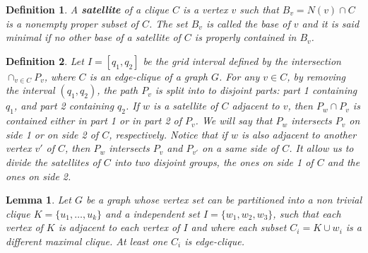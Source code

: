\documentclass[9pt]{entcs}
\newtheorem{lema}{Lemma}[section]
\newtheorem{defi}{Definition}[section]
\begin{document}
\begin{defi}
  A \textbf{satellite} of a clique $C$ is a vertex $v$ such that $B_v=N(v)\cap C$ is a 
nonempty proper subset of $C$. The set $B_v$ is called the base of $v$ and it is said minimal if no other
base of a satellite of $C$ is properly contained in $B_v$.
\end{defi}


\begin{defi}
 Let $I=[q_1,q_2]$ be the grid interval defined by the intersection $\cap_{v\in C}P_v$, where $C$
is an edge-clique of a graph $G$. For any $v\in C$, by removing the interval $(q_1,q_2)$, the path $P_v$
is split into to disjoint parts: part 1  containing $q_1$, and  part 2  containing $q_2$.
If $w$  is a satellite of $C$ adjacent to $v$, then
$P_w\cap P_v$ is contained either in part 1 or in part 2 of $P_v$. We will say that $P_w$ intersects $P_v$
on side 1 or on side 2 of $C$, respectively. Notice that if $w$  is also adjacent
to another vertex $v'$ of $C$, then   $P_w$ intersects $P_v$ and $P_{v'}$ on
a same side of $C$. It allow us to divide the satellites of $C$ into two disjoint
groups, the ones on  side 1 of $C$ and the ones on side 2.
\end{defi}


\begin{lema}\label{lem:3cliquesNotClaw}
Let $G$ be a graph whose vertex set  can be
partitioned into a non trivial clique $K=\{u_1,\ldots,u_k\}$ and a independent set $I=\{w_1,w_2,w_3\}$, such that each vertex of $K$ is adjacent to each vertex of $I$ and where each subset $C_i = K \cup w_i$ is a different maximal clique. At least one $C_i$ is edge-clique. 
\end{lema}
\end{document}
